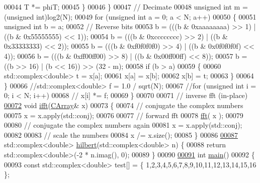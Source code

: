 \begin{DoxyCode}
00044             T *= phiT;
00045         \}
00046     \}
00047     \textcolor{comment}{// Decimate}
00048     \textcolor{keywordtype}{unsigned} \textcolor{keywordtype}{int} m = (\textcolor{keywordtype}{unsigned} int)log2(N);
00049     \textcolor{keywordflow}{for} (\textcolor{keywordtype}{unsigned} \textcolor{keywordtype}{int} a = 0; a < N; a++)
00050     \{
00051         \textcolor{keywordtype}{unsigned} \textcolor{keywordtype}{int} b = a;
00052         \textcolor{comment}{// Reverse bits}
00053         b = (((b & 0xaaaaaaaa) >> 1) | ((b & 0x55555555) << 1));
00054         b = (((b & 0xcccccccc) >> 2) | ((b & 0x33333333) << 2));
00055         b = (((b & 0xf0f0f0f0) >> 4) | ((b & 0x0f0f0f0f) << 4));
00056         b = (((b & 0xff00ff00) >> 8) | ((b & 0x00ff00ff) << 8));
00057         b = ((b >> 16) | (b << 16)) >> (32 - m);
00058         \textcolor{keywordflow}{if} (b > a)
00059         \{
00060             std::complex<double> t = x[a];
00061             x[a] = x[b];
00062             x[b] = t;
00063         \}
00064     \}
00066     \textcolor{comment}{//std::complex<double> f = 1.0 / sqrt(N);}
00067     \textcolor{comment}{//for (unsigned int i = 0; i < N; i++)}
00068     \textcolor{comment}{//  x[i] *= f;}
00069 \}
00070 
00071 \textcolor{comment}{// inverse fft (in-place)}
\hypertarget{fft__test_8cpp_source_l00072}{}\hyperlink{fft__test_8cpp_a6234aee8acb83780e803805365617f36}{00072} \textcolor{keywordtype}{void} \hyperlink{fft__test_8cpp_a6234aee8acb83780e803805365617f36}{ifft}(\hyperlink{fft__test_8cpp_ac43c8a7b2d97f3ccbd6f7a48beaa472c}{CArray}& x)
00073 \{
00074     \textcolor{comment}{// conjugate the complex numbers}
00075     x = x.apply(std::conj);
00076 
00077     \textcolor{comment}{// forward fft}
00078     \hyperlink{fft__test_8cpp_a22051cd252d576aec530227d32d95bdd}{fft}( x );
00079 
00080     \textcolor{comment}{// conjugate the complex numbers again}
00081     x = x.apply(std::conj);
00082 
00083     \textcolor{comment}{// scale the numbers}
00084     x /= x.size();
00085 \}
00086 
\hypertarget{fft__test_8cpp_source_l00087}{}\hyperlink{fft__test_8cpp_adc49b5a69e64611f421bbefee39a4d15}{00087} std::complex<double> \hyperlink{fft__test_8cpp_adc49b5a69e64611f421bbefee39a4d15}{hilbert}(std::complex<double> n) \{
00088     \textcolor{keywordflow}{return} std::complex<double>(-2 * n.imag(), 0);
00089 \}
00090 
\hypertarget{fft__test_8cpp_source_l00091}{}\hyperlink{fft__test_8cpp_ae66f6b31b5ad750f1fe042a706a4e3d4}{00091} \textcolor{keywordtype}{int} \hyperlink{fft__test_8cpp_ae66f6b31b5ad750f1fe042a706a4e3d4}{main}()
00092 \{
00093     \textcolor{keyword}{const} std::complex<double> test[] = \{ 1,2,3,4,5,6,7,8,9,10,11,12,13,14,15,16 \};

\end{DoxyCode}
